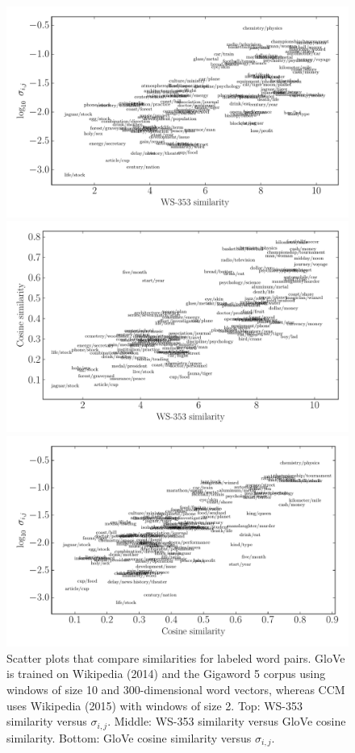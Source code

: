 \documentclass{kais}
\newcommand{\sy}[1]{\sigma_{#1}}
\begin{document}
\begin{figure}
\centerline{\includegraphics[width=0.85\columnwidth]{figures/1460989019-ws353-sigma.pdf}}
\centerline{\includegraphics[width=0.85\columnwidth]{figures/1460989019-ws353-glove-cosine.pdf}}
\centerline{\includegraphics[width=0.85\columnwidth]{figures/1460989019-glove-cosine-sigma.pdf}}
\caption{Scatter plots that compare similarities for labeled word pairs. GloVe is trained on Wikipedia (2014) and the Gigaword 5 corpus using 
windows of size 10 and 300-dimensional word vectors, whereas CCM uses Wikipedia (2015) with windows of size 2. Top: WS-353 similarity versus $\sy{i, j}$. 
Middle: WS-353 similarity versus GloVe cosine similarity. Bottom: GloVe cosine similarity versus $\sy{i, j}$.}
\label{fig:word-scatter}
\end{figure}
\end{document}
